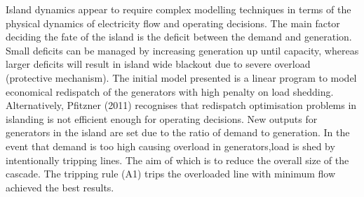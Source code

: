 \documentclass{article}
\begin{document}
Island dynamics appear to require complex modelling techniques in terms of the physical dynamics of electricity flow and operating decisions. The main factor deciding the fate of the island is the deficit between the demand and generation. Small deficits can be managed by increasing generation up until capacity, whereas larger deficits will result in island wide blackout due to severe overload (protective mechanism). The initial model presented is a linear program to model economical redispatch of the generators with high penalty on load shedding. Alternatively, Pfitzner (2011) recognises that redispatch optimisation problems in islanding is not efficient enough for operating decisions. New outputs for generators in the island are set due to the ratio of demand to generation. In the event that demand is too high causing overload in generators,load is shed by intentionally tripping lines. The aim of which is to reduce the overall size of the cascade. The tripping rule (A1) trips the overloaded line with minimum flow achieved the best results.  
\end{document}
